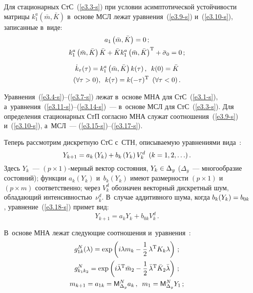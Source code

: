 \begin{multicols}{2}
Для стационарных СтС~(\ref{e3.3-s}) при условии асимптотической устойчивости матрицы $k_1^a (\bar m, \bar K)$ в~основе МСЛ лежат уравнения~(\ref{e3.9-s}) и~(\ref{e3.10-s}), записанные в~виде:
    \begin{gather}
    a_1 \left(\bar m, \bar K\right) =0\,; \label{e3.15-s}\\
   k_1^a \left(\bar m, \bar K\right) \bar K + \bar K k_1^a \left(\bar m, \bar K\right)^{\mathrm{T}} +\bar {\sigma}_0 =0\,;\label{e3.16-s}
   \end{gather}

   \vspace*{-12pt}

   \noindent
   \begin{multline}
   \dot k_\tau (\tau) = k_1^a \left(\bar m, \bar K\right)k(\tau)\,,\enskip k(0) =\bar K \\ (\forall \tau >0),\enskip k(\tau) = k (-\tau)^{\mathrm{T}} \enskip (\forall \tau <0)\,.\label{e3.17-s}
   \end{multline}

Уравнения~(\ref{e3.4-s})--(\ref{e3.7-s}) лежат в~основе МНА для СтС~(\ref{e3.1-s}), а~урав\-не\-ния~(\ref{e3.11-s})--(\ref{e3.14-s})~--- в~основе МСЛ для СтС~(\ref{e3.3-s}). Для определения стационарных СтП согласно МНА служат соотношения~(\ref{e3.9-s}) и~(\ref{e3.10-s}), а~МСЛ~--- (\ref{e3.15-s})--(\ref{e3.17-s}).

Теперь рассмотрим дискретную СтС с~СТН, описываемую уравнениями
вида~\cite{4-s, 10-s}:
    \begin{equation}
    Y_{k+1} = a_k \left(Y_k\right) + b_k \left(Y_k\right) V_k^d \enskip (k=1,2,\ldots)\,.\label{e3.18-s}
    \end{equation}
Здесь $Y_k$~--- $(p\times 1)$-мер\-ный вектор состояния, $Y_k\hm\in \Delta_y$ ($\Delta_y$~--- многообразие состояний); функции $a_k (Y_k)$ и~$b_k (Y_k)$ имеют размерности $(p\times 1)$ и~$(p\times m)$ соответственно; через $V_k^d$ обозначен векторный дискретный шум, обладающий интенсивностью~$\nu_k^d$.
В~случае аддитивного шума, когда $b_k (Y_k) \hm= b_{0k}$, уравнение~(\ref{e3.18-s}) примет вид:
    \begin{equation}
    Y_{k+1} = a_k Y_k + b_{0k} V_k^d\,.\label{e3.19-s}
    \end{equation}

В~основе МНА лежат следующие соотношения и~уравнения~\cite{4-s, 10-s}:
   \begin{gather*}
        g_{1k}^N (\la) = \exp \left( i\la m_k -\fr {1}{2}\, \la^{\mathrm{T}} K_k \la\right)\,;\\
     g_{k_1k_2}^N = \exp\left( i\bar \la^{\mathrm{T}} \bar m_2 - \fr{1}{ 2}\, \bar \la^{\mathrm{T}} \bar K_2 \bar \la\right)\,;
     \\
    m_{k+1}= a_{1k}= {\sf M}_{\Delta_y}^N a_k\,,\enskip m_1 = {\sf M}_{\Delta_y}^NY_1\,; %
    \end{gather*}


\end{multicols}
